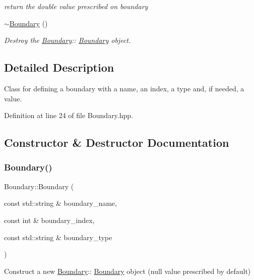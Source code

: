 \begin{DoxyCompactItemize}
\begin{DoxyCompactList}\small\item\em return the double value prescribed on boundary \end{DoxyCompactList}\item 
\mbox{\label{classBoundary_a86eab4f2362618c5b1e3d0df3a5f7f42}} 
\hyperlink{classBoundary_a86eab4f2362618c5b1e3d0df3a5f7f42}{$\sim$\+Boundary} ()
\begin{DoxyCompactList}\small\item\em Destroy the \hyperlink{classBoundary}{Boundary}\+:\+: \hyperlink{classBoundary}{Boundary} object. \end{DoxyCompactList}\end{DoxyCompactItemize}


\subsection{Detailed Description}
Class for defining a boundary with a name, an index, a type and, if needed, a value. 

Definition at line 24 of file Boundary.\+hpp.



\subsection{Constructor \& Destructor Documentation}
\mbox{\label{classBoundary_a145bbf70e6907e3d5ae3a5ac33b4bb2b}} 
\subsubsection{\texorpdfstring{Boundary()}{Boundary()}\hspace{0.1cm}{\footnotesize\ttfamily [1/2]}}
{\footnotesize\ttfamily Boundary\+::\+Boundary (\begin{DoxyParamCaption}\item[{const std\+::string \&}]{boundary\+\_\+name,  }\item[{const int \&}]{boundary\+\_\+index,  }\item[{const std\+::string \&}]{boundary\+\_\+type }\end{DoxyParamCaption})}



Construct a new \hyperlink{classBoundary}{Boundary}\+:\+: \hyperlink{classBoundary}{Boundary} object (null value prescribed by default) 


